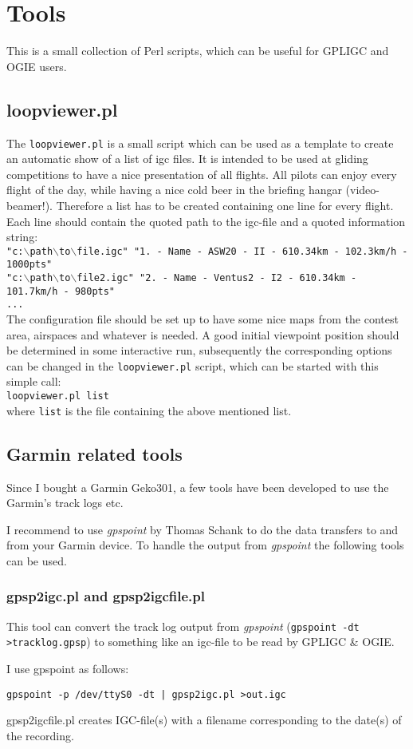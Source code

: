 \section{Tools}

This is a small collection of Perl scripts, which can be useful for GPLIGC and OGIE users.

\subsection{loopviewer.pl}
The \texttt{loopviewer.pl} is a small script which can be used as a template to create an automatic show of a list of igc files.
It is intended to be used at gliding competitions to have a nice presentation of all flights. All pilots can enjoy every flight of the day, while having a nice cold beer in the briefing hangar (video-beamer!).
Therefore a list has to be created containing one line for every flight. Each line should contain the quoted path to the igc-file and a quoted information string: \\
\texttt{"c:$\backslash$path$\backslash$to$\backslash$file.igc"   "1. - Name - ASW20 - II - 610.34km - 102.3km/h - 1000pts"} \\
\texttt{"c:$\backslash$path$\backslash$to$\backslash$file2.igc"  "2. - Name - Ventus2 - I2 - 610.34km - 101.7km/h - 980pts"} \\
\texttt{...} \\
The configuration file should be set up to have some nice maps from the contest area, airspaces and whatever is needed. A good initial viewpoint position should be determined in some interactive run, subsequently the corresponding options can be changed in the \texttt{loopviewer.pl} script, which can be started with this simple call: \\
\texttt{loopviewer.pl  list} \\
where \texttt{list} is the file containing the above mentioned list.


\subsection{Garmin related tools}

Since I bought a Garmin Geko301, a few tools have been developed to use the Garmin's track logs etc.

I recommend to use \emph{gpspoint}  by Thomas Schank to do the data transfers to and from your Garmin device.
To handle the output from \emph{gpspoint} the following tools can be used.

\subsubsection{gpsp2igc.pl and gpsp2igcfile.pl}
\label{gpsp2igc}
This tool can convert the track log output from \emph{gpspoint} (\texttt{gpspoint -dt >tracklog.gpsp})
to something like an igc-file to be read by GPLIGC \& OGIE.

I use gpspoint as follows:

\texttt{gpspoint -p /dev/ttyS0 -dt | gpsp2igc.pl >out.igc}

gpsp2igcfile.pl creates IGC-file(s) with a filename corresponding to the date(s) of the recording.
